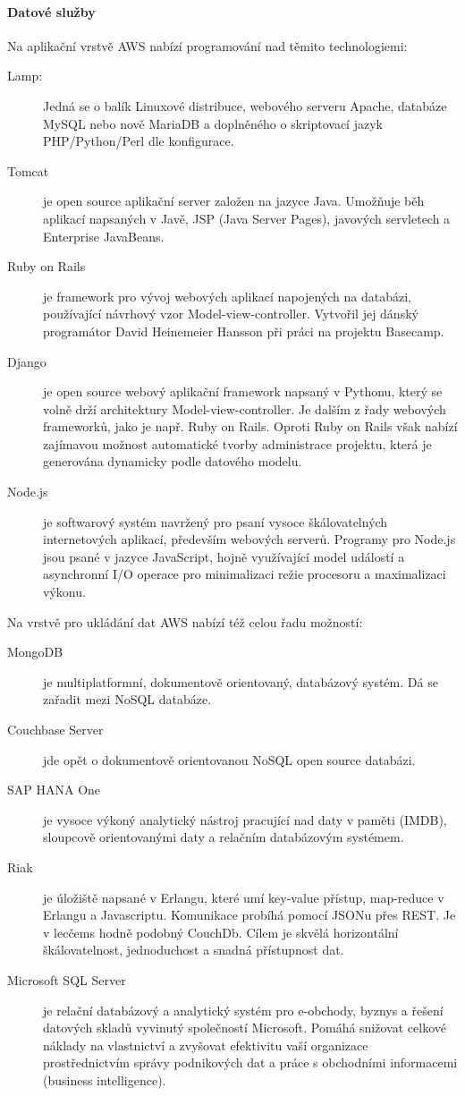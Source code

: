 \paragraph{Datové služby}
Na aplikační vrstvě AWS nabízí programování nad těmito technologiemi:
\begin{description}
	\item [Lamp:] Jedná se o balík Linuxové distribuce, webového serveru Apache, databáze MySQL nebo nově MariaDB a doplněného o skriptovací jazyk PHP/Python/Perl dle konfigurace.
	\item [Tomcat] je open source aplikační server založen na jazyce Java. Umožňuje běh aplikací napsaných v Javě, JSP (Java Server Pages), javových servletech a Enterprise JavaBeans.
	\item [Ruby on Rails] je framework pro vývoj webových aplikací napojených na databázi, používající návrhový vzor Model-view-controller. Vytvořil jej dánský programátor David Heinemeier Hansson při práci na projektu Basecamp.\cite{wiki:rails}
	\item [Django] je open source webový aplikační framework napsaný v Pythonu, který se volně drží architektury Model-view-controller. Je dalším z řady webových frameworků, jako je např. Ruby on Rails. Oproti Ruby on Rails však nabízí zajímavou možnost automatické tvorby administrace projektu, která je generována dynamicky podle datového modelu.\cite{wiki:django}
	\item [Node.js] je softwarový systém navržený pro psaní vysoce škálovatelných internetových aplikací, především webových serverů. Programy pro Node.js jsou psané v jazyce JavaScript, hojně využívající model událostí a asynchronní I/O operace pro minimalizaci režie procesoru a maximalizaci výkonu.\cite{wiki:node.js}
\end{description}

Na vrstvě pro ukládání dat AWS nabízí též celou řadu možností:
\begin{description}
	\item [MongoDB] je multiplatformní, dokumentově orientovaný, databázový systém. Dá se zařadit mezi NoSQL databáze.
	\item [Couchbase Server] jde opět o dokumentově orientovanou NoSQL open source databázi.
	\item [SAP HANA One] je vysoce výkoný analytický nástroj pracující nad daty v paměti (IMDB), sloupcově orientovanými daty a relačním databázovým systémem.
	\item [Riak] je úložiště napsané v Erlangu, které umí key-value přístup, map-reduce v Erlangu a Javascriptu. Komunikace probíhá pomocí JSONu přes REST. Je v lecčems hodně podobný CouchDb. Cílem je skvělá horizontální škálovatelnost, jednoduchost a snadná přístupnost dat.\cite{knesl:riak}
	\item [Microsoft SQL Server] je relační databázový a analytický systém pro e-obchody, byznys a řešení datových skladů vyvinutý společností Microsoft. Pomáhá snižovat celkové náklady na vlastnictví a zvyšovat efektivitu vaší organizace prostřednictvím správy podnikových dat a práce s obchodními informacemi (business intelligence).\cite{wiki:mssql}
\end{description}

